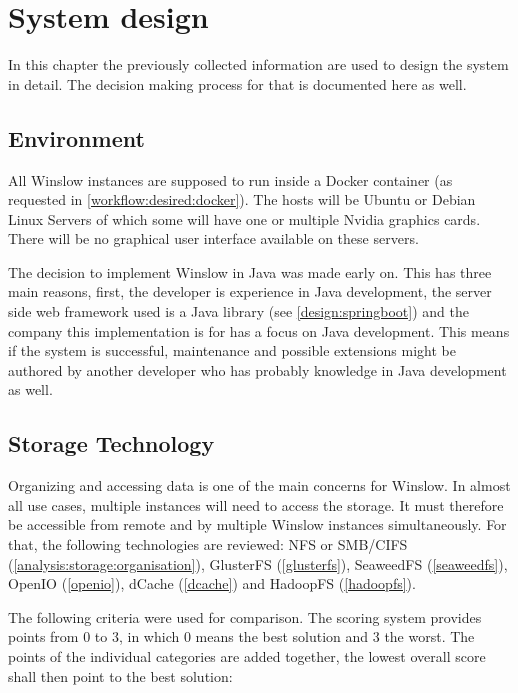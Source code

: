 \chapter{System design}

In this chapter the previously collected information are used to design the system in detail.
The decision making process for that is documented here as well.


\section{Environment}

All Winslow instances are supposed to run inside a Docker container (as requested in \autoref{workflow:desired:docker}).
The hosts will be Ubuntu or Debian Linux Servers of which some will have one or multiple Nvidia graphics cards.
There will be no graphical user interface available on these servers.

The decision to implement Winslow in Java was made early on.
This has three main reasons, first, the developer is experience in Java development, the server side web framework used is a Java library (see \autoref{design:springboot}) and the company this implementation is for has a focus on Java development.
This means if the system is successful, maintenance and possible extensions might be authored by another developer who has probably knowledge in Java development as well.


\section{Storage Technology}

Organizing and accessing data is one of the main concerns for Winslow.
In almost all use cases, multiple instances will need to access the storage.
It must therefore be accessible from remote and by multiple Winslow instances simultaneously.
For that, the following technologies are reviewed: NFS or SMB/CIFS (\autoref{analysis:storage:organisation}),  GlusterFS (\autoref{glusterfs}), SeaweedFS (\autoref{seaweedfs}), OpenIO (\autoref{openio}), dCache (\autoref{dcache}) and HadoopFS (\autoref{hadoopfs}).

The following criteria were used for comparison.
The scoring system provides points from 0 to 3, in which 0 means the best solution and 3 the worst.
The points of the individual categories are added together, the lowest overall score shall then point to the best solution:

